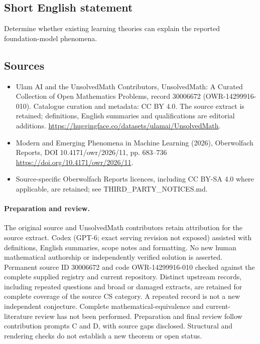 \documentclass[11pt]{article}
\begin{document}
\subsection{Short English statement}
Determine whether existing learning theories can explain the reported foundation-model phenomena.
\subsection{Sources}
\begin{itemize}
\item[\hypertarget{source:30006672:1}{S1}] Ulam AI and the UnsolvedMath Contributors, UnsolvedMath: A Curated Collection of Open Mathematics Problems, record 30006672 (OWR-14299916-010). Catalogue curation and metadata: CC BY 4.0. The source extract is retained; definitions, English summaries and qualifications are editorial additions.
\url{https://huggingface.co/datasets/ulamai/UnsolvedMath}.
\item[\hypertarget{source:30006672:2}{S2}] Modern and Emerging Phenomena in Machine Learning (2026), Oberwolfach Reports, DOI 10.4171/owr/2026/11, pp. 683--736
\url{https://doi.org/10.4171/owr/2026/11}.
\item Source-specific Oberwolfach Reports licences, including CC BY-SA 4.0 where applicable, are retained; see THIRD\_PARTY\_NOTICES.md.
\end{itemize}
\paragraph{Preparation and review.}
The original source and UnsolvedMath contributors retain attribution for the source extract. Codex (GPT-6; exact serving revision not exposed) assisted with definitions, English summaries, scope notes and formatting. No new human mathematical authorship or independently verified solution is asserted. Permanent source ID 30006672 and code OWR-14299916-010 checked against the complete supplied registry and current repository. Distinct upstream records, including repeated questions and broad or damaged extracts, are retained for complete coverage of the source CS category. A repeated record is not a new independent conjecture. Complete mathematical-equivalence and current-literature review has not been performed. Preparation and final review follow contribution prompts C and D, with source gaps disclosed. Structural and rendering checks do not establish a new theorem or open status.
\label{end:30006672}
\end{document}
